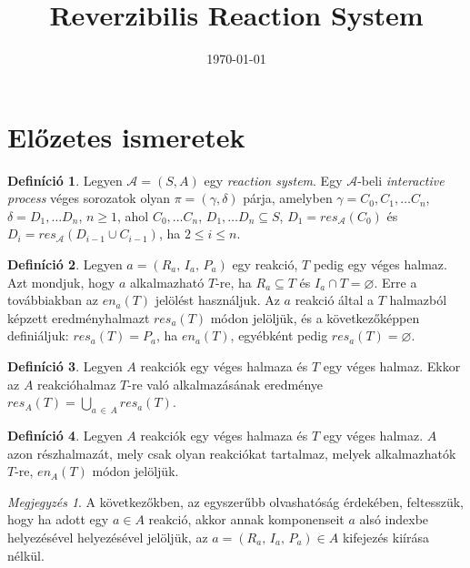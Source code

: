 \documentclass[12pt]{article}
\title{Reverzibilis Reaction System}
\date{\today}
\theoremstyle{definition}
\newtheorem*{definition*}{Definíció}
\theoremstyle{remark}
\newtheorem*{remark*}{Megjegyzés}
\theoremstyle{plain}
\let\emptyset\varnothing
\newcommand{\en}{\textit{en}}
\newcommand{\res}{\textit{res}}
\newcommand{\reaction}[3]{
    (#1, \, #2, \, #3)
}
\begin{document}
    \maketitle

    \section*{Előzetes ismeretek}

    \begin{definition*}
        Legyen $\mathscr{A} = (S, A)$ egy \textit{reaction system}. Egy $\mathscr{A}$-beli \textit{interactive process} véges sorozatok olyan $\pi = (\gamma, \delta)$ párja, amelyben $\gamma = C_{0}, C_{1}, \ldots C_{n}$, $\delta = D_{1}, \ldots D_{n}$, $n \geq 1$, ahol $C_{0}, \ldots C_{n}$, $D_{1}, \ldots D_{n} \subseteq S$, $D_{1} = \textit{res}_{\mathscr{A}}(C_{0})$ és $D_{i} = \textit{res}_{\mathscr{A}}(D_{i - 1} \cup C_{i - 1})$, ha $2 \leq i \leq n$.
    \end{definition*}

    \begin{definition*}
        Legyen $a = \reaction{R_{a}}{I_{a}}{P_{a}}$ egy reakció, $T$ pedig egy véges halmaz. Azt mondjuk, hogy $a$ alkalmazható $T$-re, ha $R_{a} \subseteq T$ és $I_{a} \cap T = \emptyset$. Erre a továbbiakban az $\en_{a}(T)$ jelölést használjuk. Az $a$ reakció által a $T$ halmazból képzett eredményhalmazt $\res_{a}(T)$ módon jelöljük, és a következőképpen definiáljuk: $\res_{a}(T) = P_{a}$, ha $\en_{a}(T)$, egyébként pedig $\res_{a}(T) = \emptyset$.
    \end{definition*}

    \begin{definition*}
        Legyen $A$ reakciók egy véges halmaza és $T$ egy véges halmaz. Ekkor az $A$ reakcióhalmaz $T$-re való alkalmazásának eredménye $\res_{A}(T) = \bigcup_{a \,\in\, A}\res_{a}(T)$.
    \end{definition*}

    \begin{definition*}
        Legyen $A$ reakciók egy véges halmaza és $T$ egy véges halmaz. $A$ azon részhalmazát, mely csak olyan reakciókat tartalmaz, melyek alkalmazhatók $T$-re, $\en_{A}(T)$ módon jelöljük.
    \end{definition*}
    
    \begin{remark*}
        A következőkben, az egyszerűbb olvashatóság érdekében, feltesszük, hogy ha adott egy $a \in A$ reakció, akkor annak komponenseit $a$ alsó indexbe helyezésével helyezésével jelöljük, az $a = \reaction{R_{a}}{I_{a}}{P_{a}} \in A$ kifejezés kiírása nélkül.
    \end{remark*}
\end{document}
